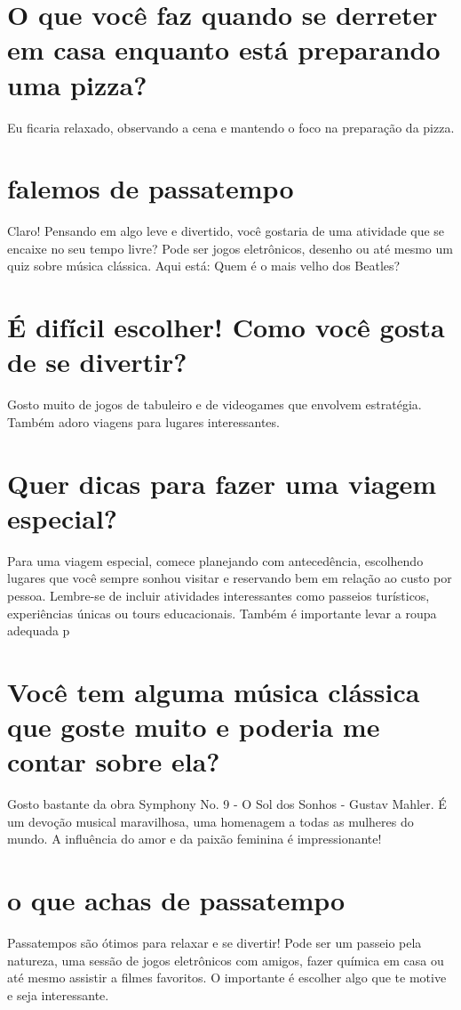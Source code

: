 \documentclass[11pt,a4paper]{article}
\begin{document}
\section{O que você faz quando se derreter em casa enquanto está preparando uma pizza?}
Eu ficaria relaxado, observando a cena e mantendo o foco na preparação da pizza.

\section{falemos de passatempo}
Claro! Pensando em algo leve e divertido, você gostaria de uma atividade que se encaixe no seu tempo livre? Pode ser jogos eletrônicos, desenho ou até mesmo um quiz sobre música clássica. Aqui está: Quem é o mais velho dos Beatles?

\section{É difícil escolher! Como você gosta de se divertir?}
Gosto muito de jogos de tabuleiro e de videogames que envolvem estratégia. Também adoro viagens para lugares interessantes.

\section{Quer dicas para fazer uma viagem especial?}
Para uma viagem especial, comece planejando com antecedência, escolhendo lugares que você sempre sonhou visitar e reservando bem em relação ao custo por pessoa. Lembre-se de incluir atividades interessantes como passeios turísticos, experiências únicas ou tours educacionais. Também é importante levar a roupa adequada p

\section{Você tem alguma música clássica que goste muito e poderia me contar sobre ela?}
Gosto bastante da obra Symphony No. 9 -  O Sol dos Sonhos - Gustav Mahler. É um devoção musical maravilhosa, uma homenagem a todas as mulheres do mundo. A influência do amor e da paixão feminina é impressionante!

\section{o que achas de passatempo}
Passatempos são ótimos para relaxar e se divertir! Pode ser um passeio pela natureza, uma sessão de jogos eletrônicos com amigos, fazer química em casa ou até mesmo assistir a filmes favoritos. O importante é escolher algo que te motive e seja interessante.
\end{document}

